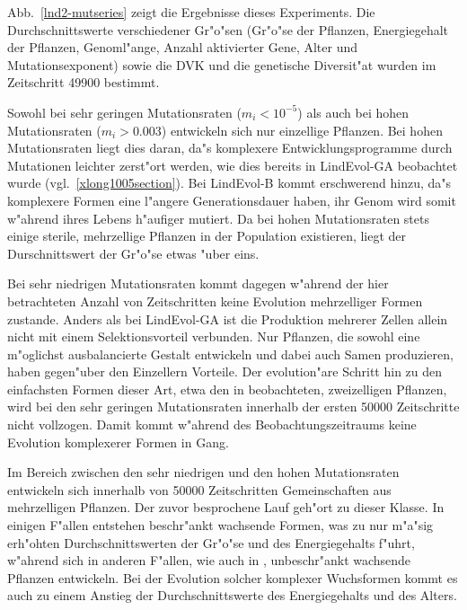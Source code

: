 Abb.\ \ref{lnd2-mutseries} zeigt die Ergebnisse dieses Experiments. Die Durchschnittswerte verschiedener Gr"o"sen
(Gr"o"se der Pflanzen, Energiegehalt der Pflanzen, Genoml"ange, Anzahl aktivierter Gene, Alter und Mutationsexponent)
sowie die DVK und die genetische Diversit"at wurden im Zeitschritt 49900 bestimmt.

Sowohl bei sehr geringen Mutationsraten ($m_i < 10^{-5}$) als auch bei hohen Mutationsraten ($m_i > 0.003$) entwickeln sich
nur einzellige Pflanzen. Bei hohen Mutationsraten liegt dies daran, da"s komplexere Entwicklungsprogramme durch Mutationen
leichter zerst"ort werden, wie dies bereits in LindEvol-GA beobachtet wurde (vgl.\ \ref{xlong1005section}). Bei LindEvol-B
kommt erschwerend hinzu, da"s komplexere Formen eine l"angere Generationsdauer haben, ihr Genom wird somit w"ahrend ihres
Lebens h"aufiger mutiert. Da bei hohen Mutationsraten stets einige sterile, mehrzellige Pflanzen in der Population existieren,
liegt der Durschnittswert der Gr"o"se etwas "uber eins.

Bei sehr niedrigen Mutationsraten kommt dagegen w"ahrend der hier betrachteten Anzahl von Zeitschritten keine
Evolution mehrzelliger Formen zustande. Anders als bei LindEvol-GA ist die Produktion mehrerer Zellen allein nicht
mit einem Selektionsvorteil verbunden. Nur Pflanzen, die sowohl eine m"oglichst ausbalancierte Gestalt entwickeln
und dabei auch Samen produzieren, haben gegen"uber den Einzellern Vorteile. Der evolution"are Schritt hin zu den
einfachsten Formen dieser Art, etwa den in  beobachteten, zweizelligen Pflanzen,
wird bei den sehr geringen Mutationsraten innerhalb der ersten 50000 Zeitschritte nicht vollzogen. Damit kommt
w"ahrend des Beobachtungszeitraums keine Evolution komplexerer Formen in Gang.

\begin{sloppypar}
Im Bereich zwischen den sehr niedrigen und den hohen Mutationsraten entwickeln sich innerhalb von 50000
Zeitschritten Gemeinschaften aus mehrzelligen Pflanzen. Der zuvor besprochene Lauf  geh"ort
zu dieser Klasse. In einigen F"allen entstehen beschr"ankt wachsende Formen, was zu nur m"a"sig erh"ohten
Durchschnittswerten der Gr"o"se und des Energiegehalts f"uhrt, w"ahrend sich in anderen F"allen, wie auch in
, unbeschr"ankt wachsende Pflanzen entwickeln. Bei der Evolution solcher komplexer Wuchsformen
kommt es auch zu einem Anstieg der Durchschnittswerte des Energiegehalts und des Alters.
\end{sloppypar}


